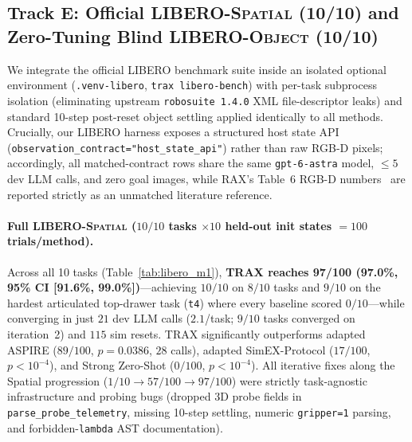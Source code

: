 \documentclass{trax}
\begin{document}
\subsection{Track E: Official \textsc{LIBERO-Spatial} (10/10) and Zero-Tuning Blind \textsc{LIBERO-Object} (10/10)}
We integrate the official LIBERO benchmark suite inside an isolated optional environment (\texttt{.venv-libero}, \texttt{trax libero-bench}) with per-task subprocess isolation (eliminating upstream \texttt{robosuite 1.4.0} XML file-descriptor leaks) and standard 10-step post-reset object settling applied identically to all methods. Crucially, our LIBERO harness exposes a structured host state API (\texttt{observation\_contract="host\_state\_api"}) rather than raw RGB-D pixels; accordingly, all matched-contract rows share the same \texttt{gpt-6-astra} model, $\le 5$ dev LLM calls, and zero goal images, while RAX's Table~6 RGB-D numbers~\cite{huang2026rax} are reported strictly as an unmatched literature reference.

\paragraph{Full \textsc{LIBERO-Spatial} ($10/10$ tasks $\times 10$ held-out init states $= 100$ trials/method).} Across all 10 tasks (Table~\ref{tab:libero_m1}), \textbf{TRAX reaches 97/100 (97.0\%, 95\% CI [91.6\%, 99.0\%])}---achieving $10/10$ on $8/10$ tasks and $9/10$ on the hardest articulated top-drawer task (\texttt{t4}) where every baseline scored $0/10$---while converging in just $21$ dev LLM calls ($2.1$/task; $9/10$ tasks converged on iteration~2) and $115$ sim resets. TRAX significantly outperforms adapted ASPIRE ($89/100$, $p{=}0.0386$, $28$ calls), adapted SimEX-Protocol ($17/100$, $p{<}10^{-4}$), and Strong Zero-Shot ($0/100$, $p{<}10^{-4}$). All iterative fixes along the Spatial progression ($1/10 \to 57/100 \to 97/100$) were strictly task-agnostic infrastructure and probing bugs (dropped 3D probe fields in \texttt{parse\_probe\_telemetry}, missing 10-step settling, numeric \texttt{gripper=1} parsing, and forbidden-\texttt{lambda} AST documentation).
\end{document}
